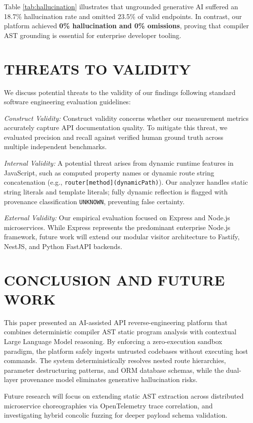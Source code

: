\documentclass[a4paper,10pt]{article}
\begin{document}
Table \ref{tab:hallucination} illustrates that ungrounded generative AI suffered an 18.7\% hallucination rate and omitted 23.5\% of valid endpoints. In contrast, our platform achieved \textbf{0\% hallucination and 0\% omissions}, proving that compiler AST grounding is essential for enterprise developer tooling.

\section{THREATS TO VALIDITY}
\noindent
We discuss potential threats to the validity of our findings following standard software engineering evaluation guidelines:

\textit{Construct Validity:} Construct validity concerns whether our measurement metrics accurately capture API documentation quality. To mitigate this threat, we evaluated precision and recall against verified human ground truth across multiple independent benchmarks.

\textit{Internal Validity:} A potential threat arises from dynamic runtime features in JavaScript, such as computed property names or dynamic route string concatenation (e.g., \texttt{router[method](dynamicPath)}). Our analyzer handles static string literals and template literals; fully dynamic reflection is flagged with provenance classification \texttt{UNKNOWN}, preventing false certainty.

\textit{External Validity:} Our empirical evaluation focused on Express and Node.js microservices. While Express represents the predominant enterprise Node.js framework, future work will extend our modular visitor architecture to Fastify, NestJS, and Python FastAPI backends.

\section{CONCLUSION AND FUTURE WORK}
\noindent
This paper presented an AI-assisted API reverse-engineering platform that combines deterministic compiler AST static program analysis with contextual Large Language Model reasoning. By enforcing a zero-execution sandbox paradigm, the platform safely ingests untrusted codebases without executing host commands. The system deterministically resolves nested route hierarchies, parameter destructuring patterns, and ORM database schemas, while the dual-layer provenance model eliminates generative hallucination risks.

Future research will focus on extending static AST extraction across distributed microservice choreographies via OpenTelemetry trace correlation, and investigating hybrid concolic fuzzing for deeper payload schema validation.
\end{document}
